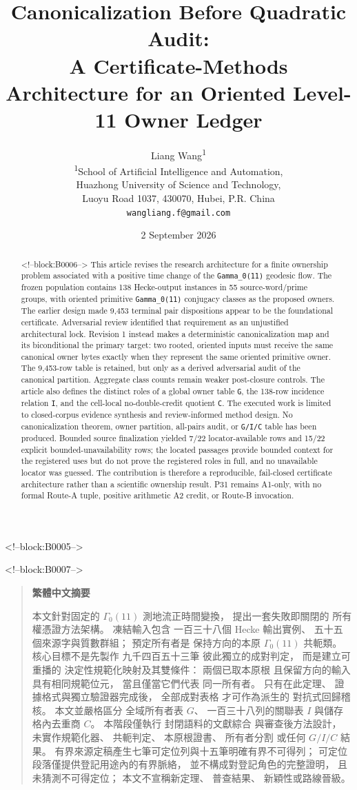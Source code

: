 \documentclass[11pt]{article}
\title{Canonicalization Before Quadratic Audit:\\
A Certificate-Methods Architecture for an Oriented Level-11 Owner Ledger}
\author{Liang Wang\textsuperscript{1}\\
\small \textsuperscript{1}School of Artificial Intelligence and Automation,\\
\small Huazhong University of Science and Technology,\\
\small Luoyu Road 1037, 430070, Hubei, P.R. China\\
\small \texttt{wangliang.f@gmail.com}}
\date{2 September 2026}
\newenvironment{zhabstract}
  {\begin{quotation}\cjkfont\small\raggedright\noindent\textbf{繁體中文摘要}\par\smallskip\mdseries}
  {\end{quotation}}
\begin{document}
\maketitle

<!--block:B0005-->
\begin{abstract}

<!--block:B0006-->
This article revises the research architecture for a finite ownership
problem associated with a positive time change of the
\texttt{Gamma\_0(11)} geodesic flow. The frozen population contains 138
Hecke-output instances in 55 source-word/prime groups, with oriented
primitive \texttt{Gamma\_0(11)} conjugacy classes as the proposed
owners. The earlier design made 9,453 terminal pair dispositions appear
to be the foundational certificate. Adversarial review identified that
requirement as an unjustified architectural lock. Revision 1 instead
makes a deterministic canonicalization map and its biconditional the
primary target: two rooted, oriented inputs must receive the same
canonical owner bytes exactly when they represent the same oriented
primitive owner. The 9,453-row table is retained, but only as a derived
adversarial audit of the canonical partition. Aggregate class counts
remain weaker post-closure controls. The article also defines the
distinct roles of a global owner table \texttt{G}, the 138-row incidence
relation \texttt{I}, and the cell-local no-double-credit quotient
\texttt{C}. The executed work is limited to closed-corpus evidence
synthesis and review-informed method design. No canonicalization
theorem, owner partition, all-pairs audit, or \texttt{G/I/C} table has
been produced. Bounded source finalization yielded 7/22 locator-available rows and
15/22 explicit bounded-unavailability rows; the located passages provide
bounded context for the registered uses but do not prove the registered roles
in full, and no unavailable locator was guessed. The contribution is therefore a
reproducible, fail-closed certificate architecture rather than a
scientific ownership result. P31 remains A1-only, with no formal Route-A
tuple, positive arithmetic A2 credit, or Route-B invocation.
\end{abstract}

<!--block:B0007-->
\begin{zhabstract}
本文針對固定的 $\Gamma_0(11)$ 測地流正時間變換， 提出一套失敗即關閉的 所有權憑證方法架構。 凍結輸入包含 一百三十八個 Hecke 輸出實例、 五十五個來源字與質數群組； 預定所有者是 保持方向的本原 $\Gamma_0(11)$ 共軛類。 核心目標不是先製作 九千四百五十三筆 彼此獨立的成對判定， 而是建立可重播的 決定性規範化映射及其雙條件： 兩個已取本原根 且保留方向的輸入 具有相同規範位元， 當且僅當它們代表 同一所有者。 只有在此定理、 證據格式與獨立驗證器完成後， 全部成對表格 才可作為派生的 對抗式回歸稽核。 本文並嚴格區分 全域所有者表 $G$、 一百三十八列的關聯表 $I$ 與儲存格內去重商 $C$。 本階段僅執行 封閉語料的文獻綜合 與審查後方法設計， 未實作規範化器、 共軛判定、 本原根證書、 所有者分割 或任何 $G/I/C$ 結果。 有界來源定稿產生七筆可定位列與十五筆明確有界不可得列； 可定位段落僅提供登記用途內的有界脈絡， 並不構成對登記角色的完整證明， 且未猜測不可得定位； 本文不宣稱新定理、 普查結果、 新穎性或路線晉級。
\end{zhabstract}
\end{document}
